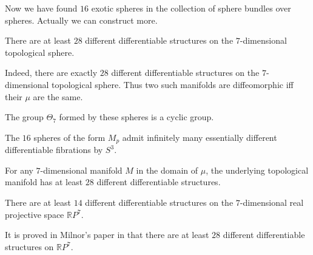 \documentclass[twoside]{article}
\begin{document}
Now we have found $16$ exotic spheres in the collection of sphere bundles over spheres. Actually we can construct more. 
\begin{thm}
    There are at least $28$ different differentiable structures on the $7$-dimensional topological sphere. 
\end{thm}

Indeed, there are exactly $28$ different differentiable structures on the $7$-dimensional topological sphere. Thus two such manifolds are diffeomorphic iff their $\mu$ are the same. 

\begin{cor}
    The group $\Theta_7$ formed by these spheres is a cyclic group. 
\end{cor}

\begin{cor}
    The $16$ spheres of the form $M_p$ admit infinitely many essentially different differentiable fibrations by $S^3$. 
\end{cor}


\begin{prop}
    For any $7$-dimensional manifold $M$ in the domain of $\mu$, the underlying topological manifold has at least $28$ different differentiable structures. 
\end{prop}

\begin{prop}
    There are at least $14$ different differentiable structures on the $7$-dimensional real projective space $\mathbb{R}P^7$. 
\end{prop}

It is proved in Milnor's paper in \cite{milnorspin} that there are at least $28$ different differentiable structures on  $\mathbb{R}P^7$. 
\end{document}
